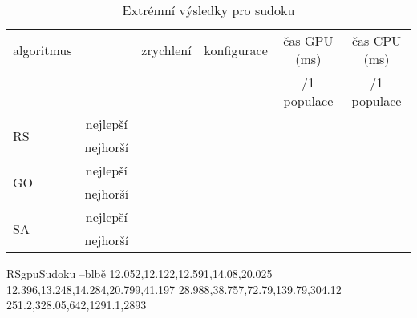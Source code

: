 \begin{table}[h]
    \begin{center}
    \begin{tabular}{lccccc}
      \toprule
      algoritmus &  & zrychlení & konfigurace & čas GPU (ms) & čas CPU (ms) \\
      & & & & /1 populace & /1 populace \\
      \midrule
      \multirow{2}{*}{RS} & nejlepší & & & & \\
                        & nejhorší & & & & \\
      \multirow{2}{*}{GO} & nejlepší & & & & \\
                        & nejhorší & & & & \\
      \multirow{2}{*}{SA} & nejlepší & & & & \\
                        & nejhorší & & & & \\
      \bottomrule
    \end{tabular}
    \caption{Extrémní výsledky pro sudoku}
    \end{center}
\end{table}





RSgpuSudoku --blbě
12.052,12.122,12.591,14.08,20.025
12.396,13.248,14.284,20.799,41.197
28.988,38.757,72.79,139.79,304.12
251.2,328.05,642,1291.1,2893